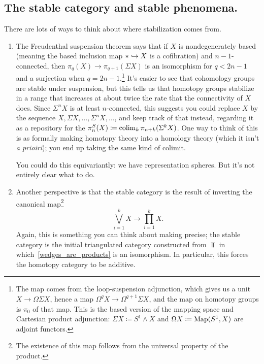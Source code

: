 \subsection*{The stable category and stable phenomena.}
There are lots of ways to think about where stabilization comes from.
\begin{enumerate}
	\item The Freudenthal suspension theorem says that if $X$ is nondegenerately based (meaning the based inclusion
	map $*\hookrightarrow X$ is a cofibration) and $n-1$-connected, then $\pi_q(X)\to\pi_{q+1}(\Sigma
	X)$ is an isomorphism for $q < 2n-1$ and a surjection when $q = 2n-1$.\footnote{The map comes from the
	loop-suspension adjunction, which gives us a unit $X\to\Omega\Sigma X$, hence a map
	$\Omega^qX\to\Omega^{q+1}\Sigma X$, and the map on homotopy groups is $\pi_0$ of that map. This is the based
	version of the mapping space and Cartesian product adjunction: $\Sigma X\coloneqq S^1\wedge X$ and $\Omega X
	\coloneqq \operatorname{Map}(S^1, X)$ are adjoint functors.} It's easier to see that cohomology groups are stable under
	suspension, but this tells us that homotopy groups stabilize in a range that increases at about twice the rate
	that the connectivity of $X$ does. Since $\Sigma^n X$ is at least $n$-connected, this suggests you could
	replace $X$ by the sequence $X, \Sigma X,\dotsc,\Sigma^n X,\dotsc$, and keep track of that instead, regarding
	it as a repository for the  $\pi_n^S(X)\coloneqq\operatorname*{colim}_k \pi_{n+k}(\Sigma^k X)$.
	One way to think of this is as formally making homotopy theory into a homology theory (which it isn't \textit{a
	prioiri}); you end up taking the same kind of colimit.

	You could do this equivariantly: we have representation spheres. But it's not entirely clear what to do.
	\item Another perspective is that the stable category is the result of inverting the canonical map\footnote{The
	existence of this map follows from the universal property of the product.}
	\begin{equation}
	\label{wedges_are_products}
	\bigvee_{i=1}^k X\to\prod_{i=1}^k X.
	\end{equation}
	Again, this is something you can think about making precise; the stable category is the initial triangulated
	category constructed from $\Top$ in which~\eqref{wedges_are_products} is an isomorphism. In particular, this
	forces the homotopy category to be additive.


\end{enumerate}
